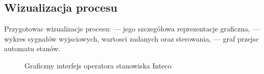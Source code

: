\subsection{Wizualizacja procesu}
\label{lab:zad12}

Przygotowac wizualizacje procesu:
— jego szczegółowa reprezentacje graficzna,
— wykres sygnałów wyjsciowych, wartosci zadanych oraz sterowania,
— graf przejsc automatu stanów.

\ifdefined\CompileImages
    \begin{figure}[H]      
        \caption{Graficzny interfejs operatora stanowiska Inteco}
    \end{figure}
\fi
\newpage
